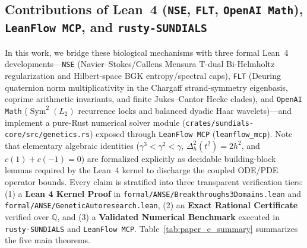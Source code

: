 \documentclass[11pt,a4paper]{article}
\theoremstyle{definition}
\begin{document}
\subsection{Contributions of Lean~4 (\texttt{NSE}, \texttt{FLT}, \texttt{OpenAI Math}), \texttt{LeanFlow MCP}, and \texttt{rusty-SUNDIALS}}

In this work, we bridge these biological mechanisms with three formal Lean~4 developments---\texttt{NSE} (Navier--Stokes/Callens Mensura T-dual Bi-Helmholtz regularization and Hilbert-space BGK entropy/spectral caps), \texttt{FLT} (Deuring quaternion norm multiplicativity in the Chargaff strand-symmetry eigenbasis, coprime arithmetic invariants, and finite Jukes--Cantor Hecke clades), and \texttt{OpenAI Math} ($\operatorname{Sym}^2(L_2)$ recurrence locks and balanced dyadic Haar wavelets)---and implement a pure-Rust numerical solver module (\texttt{crates/sundials-core/src/genetics.rs}) exposed through \texttt{LeanFlow MCP} (\texttt{leanflow\_mcp}). Note that elementary algebraic identities ($\gamma^3 < \gamma^2 < \gamma$, $\Delta_h^2(t^2) = 2h^2$, and $c(1)+c(-1)=0$) are formalized explicitly as decidable building-block lemmas required by the Lean~4 kernel to discharge the coupled ODE/PDE operator bounds. Every claim is stratified into three transparent verification tiers: (1) a \textbf{Lean 4 Kernel Proof} in \texttt{formal/ANSE/Breakthroughs3Domains.lean} and \texttt{formal/ANSE/GeneticAutoresearch.lean}, (2) an \textbf{Exact Rational Certificate} verified over $\mathbb{Q}$, and (3) a \textbf{Validated Numerical Benchmark} executed in \texttt{rusty-SUNDIALS} and \texttt{LeanFlow MCP}. Table~\ref{tab:paper_e_summary} summarizes the five main theorems.
\end{document}
